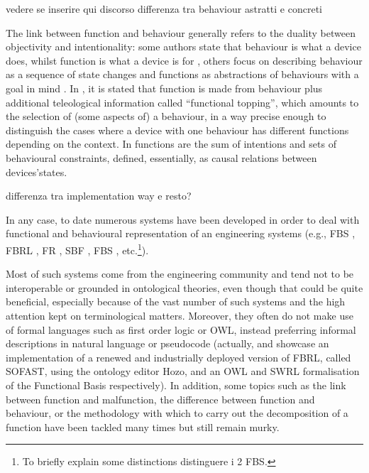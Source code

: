 \documentclass[crcready]{iosart2x}
\newcommand{\OWL}{\textnormal{OWL}\xspace}
\newcommand{\TODO}[1]{{\color{red} #1}}
\begin{document}

\TODO{vedere se inserire qui discorso differenza tra behaviour astratti e concreti}

The link between function and behaviour generally refers to the duality between objectivity and intentionality: some authors state that behaviour is what a device does, whilst function is what a device is for \cite{kleer_qualitative_1984}, 
others focus on describing behaviour as a sequence of state changes and functions as abstractions of behaviours with a goal in mind \cite{umedaFunctionBehaviourStructure1990}. In \cite{sasajimaFBRLFunctionBehavior1995, sasajimaInvestigationDomainOntology1994}, 
it is stated that function is made from behaviour plus additional teleological information called ``functional topping'', which amounts to the selection of (some aspects of) a behaviour, in a way precise enough to distinguish the cases where a device with one behaviour 
has different functions depending on the context. In \cite{chandrasekaranFunctionDeviceRepresentation2000} functions are the sum of intentions and sets of behavioural constraints, defined, essentially, as causal relations between devices'states.

\TODO{differenza tra implementation way e resto?}

In any case, to date numerous systems have been developed in order to deal with functional and behavioural representation of an engineering systems 
(e.g., FBS \cite{umedaFunctionBehaviourStructure1990}, FBRL \cite{sasajimaFBRLFunctionBehavior1995}, FR \cite{sembugamoorthy1986functional}, 
SBF \cite{goelUseDesignPatterns2004}, FBS \cite{qianFunctionBehaviorStructure1996}, etc.\footnote{To briefly explain some distinctions \TODO{distinguere i 2 FBS}.}). 

Most of such systems come from the engineering community and tend not to be interoperable or grounded in ontological theories, even though that could be quite beneficial, especially 
because of the vast number of such systems and the high attention kept on terminological matters. 
Moreover, they often do not make use of formal languages such as first order logic or \OWL, instead preferring informal descriptions in natural language or pseudocode (actually, 
\cite{kitamuraOntologicalModelDevice2006} and \cite{yangFunctionSemanticRepresentation2010} %
showcase an implementation of a renewed and industrially deployed version of FBRL, called SOFAST, using the ontology editor Hozo, and 
an \OWL and SWRL formalisation of the Functional Basis %
respectively).
In addition, some topics such as the link between function and malfunction, the difference between function and behaviour, or the methodology with which to carry out the decomposition of a function have been tackled many times but still remain murky.
\end{document}
